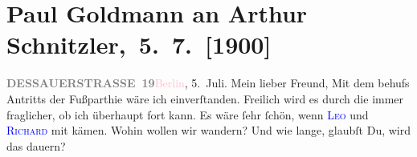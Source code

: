 

         
         \renewcommand{\erwaehntePersonen}{Personen: Richard Beer-Hofmann, Ludwig Fulda, Alfred Kerr, Leo Van-Jung}
         \renewcommand{\erwaehnteOrte}{Orte: Berlin, China, Dessauer Straße, Innsbruck, Reichenau an der Rax}
         \renewcommand{\erwaehnteWerke}{}
               \section[ Paul Goldmann an Arthur Schnitzler, 5. 7. {[}1900{]}]{Paul Goldmann an Arthur Schnitzler, 5. 7. {[}1900{]}}\nopagebreak{}\rehead{ }\normalsize\beginnumbering{} \toendnotes[C]{\smallbreak\pagebreak[2]} 
\toendnotes[C]{\smallbreak}\pstart
           \noindent{}{\pb}\textcolor{pink}{\textcolor{gray}{\textbf{DESSAUERSTRASSE 19}}}{}\ledrightnote{\textcolor{pink}{Dessauer Straße}}\hfill \textcolor{pink}{Berlin}{}\ledrightnote{\textcolor{pink}{Berlin}}, 5. Juli.\pend
           \pstart\center{}Mein lieber Freund,\pend\pstart
           Mit dem \label{K_L02923-1v}\label{K_L02923-1h} behufs Antritts der Fußparthie wäre ich einverſtanden. Freilich wird es durch
               die \label{K_L02923-3v}\label{K_L02923-3h} immer fraglicher, ob ich
               überhaupt fort kann. Es wäre ſehr ſchön, wenn \textsc{\textcolor{blue}{Leo}{}\ledrightnote{\textcolor{blue}{Leo Van-Jung}}} und \textsc{\textcolor{blue}{Richard}{}\ledrightnote{\textcolor{blue}{Richard Beer-Hofmann}}} mit kämen. Wohin wollen wir wandern? Und wie lange, glaubſt Du, wird das
               dauern?\pend
